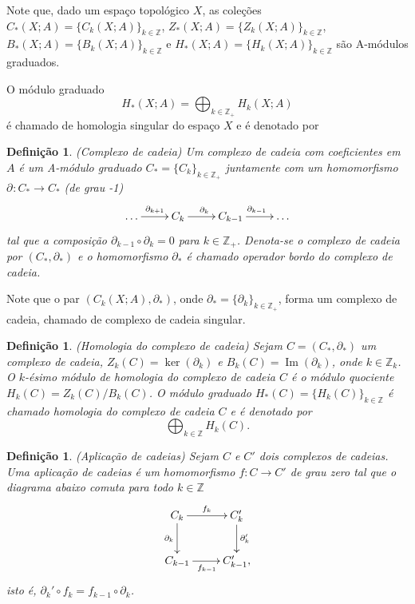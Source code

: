 \documentclass[12pt]{book}
\newtheorem{definicao}[teorema]{Definição}
\DeclareMathOperator{\Ima}{Im}
\newcommand{\bordo}[1]{\partial_{#1}}
\newcommand{\cadeia}[2]{C_{#1}(#2; A)}
\newcommand{\colecaoabrev}[1]{\{#1 \}_{k\in \inteiros}}
\newcommand{\homologia}[2]{H_{#1}(#2;A)}
\newcommand{\homologiaabrev}[2]{H_{#1}(#2)}
\newcommand{\imagem}[1]{\Ima(#1)}
\newcommand{\imagembordo}[2]{B_{#1}(#2;A)}
\newcommand{\imagembordoabrev}[2]{B_{#1}(#2)}
\newcommand{\inteiros}{\mathbb{Z}}
\newcommand{\kernelbordo}[2]{Z_{#1}(#2;A)}
\newcommand{\kernelbordoabrev}[2]{Z_{#1}(#2)}
\begin{document}
	Note que, dado um espaço topológico $X$, as coleções $\cadeia{*}{X} = \colecaoabrev{\cadeia{k}{X}}$, $\kernelbordo{*}{X}=\colecaoabrev{\kernelbordo{k}{X}}$, $\imagembordo{*}{X}=\colecaoabrev{\imagembordo{k}{X}}$ e $\homologia{*}{X}=\colecaoabrev{\homologia{k}{X}}$ são A-módulos graduados.
	
	O módulo graduado 
	$$
	\homologia{*}{X}=\bigoplus_{k\in \inteiros_{+}}\homologia{k}{X}
	$$
	é chamado de homologia singular do espaço $X$ e é denotado por
	
	\begin{definicao}
		(Complexo de cadeia) Um complexo de cadeia com coeficientes em $A$ é um A-módulo graduado $C_{*} = \{C_{k}\}_{k \in \inteiros_{+} } $ juntamente com um homomorfismo $\bordo{}:C_{*} \to C_{*}$ (de grau -1)
		$$
		\xymatrix{
			\dots \ar[r]^{\bordo{k+1}}  & C_{k} \ar[r]^{\bordo{k}} & C_{k-1}\ar[r]^{\bordo{k-1}} &\dots
		}
		$$
		tal que a composição $\bordo{k-1}\circ\bordo{k} = 0$ para $k \in \inteiros_{+}$. Denota-se o complexo de cadeia por $(C_{*}, \bordo{*})$ e o homomorfismo $\bordo{*}$ é chamado operador bordo do complexo de cadeia.
	\end{definicao}
	
	Note que o par $(\cadeia{k}{X}, \bordo{*})$, onde $\bordo{*}=\{\bordo{k}\}_{k\in \inteiros_{+}}$, forma um complexo de cadeia, chamado de complexo de cadeia singular.
	
	\begin{definicao}
		(Homologia do complexo de cadeia) Sejam $C=(C_{*}, \bordo{*})$ um complexo de cadeia, $Z_{k}(C) = \ker(\bordo{k})$ e $B_{k}(C) = \imagem{\bordo{k}}$, onde $k\in \inteiros_{k}$. O $k$-ésimo módulo de homologia do complexo de cadeia $C$ é o módulo quociente
		$\homologiaabrev{k}{C} = \kernelbordoabrev{k}{C}/\imagembordoabrev{k}{C}$. O módulo graduado $\homologiaabrev{*}{C} = \colecaoabrev{\homologiaabrev{k}{C}}$ é chamado homologia do complexo de cadeia $C$ e é denotado por
		$$
		\bigoplus_{k\in \inteiros}\homologiaabrev{k}{C}.
		$$				
	\end{definicao}

	\begin{definicao}
		(Aplicação de cadeias) Sejam $C$ e $C'$ dois complexos de cadeias. Uma aplicação de cadeias é um homomorfismo $f:C\to C'$ de grau zero tal que o diagrama abaixo comuta para todo $k \in \inteiros$
		$$
		\xymatrix{
			C_{k}\ar[d]_{\bordo{k}}\ar[r]^{f_{k}}  & C'_{k}\ar[d]^{\bordo{k}'} 
			\\
			C_{k-1}\ar[r]_{f_{k-1}} & C'_{k-1},
		}
		$$
		isto é, $\bordo{k}'\circ f_{k} = f_{k-1}\circ \bordo{k}$.
	\end{definicao}
	
\end{document}
